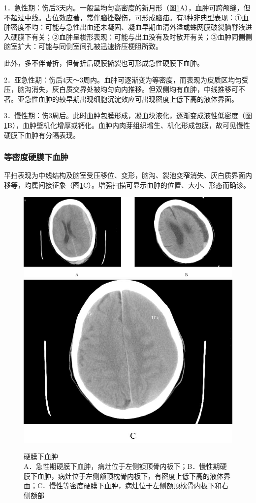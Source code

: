 1．急性期：伤后3天内。一般呈均匀高密度的新月形（图\ref{fig2-31}A），血肿可跨颅缝，但不超过中线。占位效应著，常伴脑挫裂伤，可形成脑疝。有3种非典型表现：①血肿密度不均：可能与急性出血还未凝固、凝血早期血清外溢或蛛网膜破裂脑脊液进入硬膜下有关；②血肿呈梭形表现：可能与出血没有及时散开有关；③血肿同侧侧脑室扩大：可能与同侧室间孔被迅速挤压梗阻所致。

此外，多不伴骨折，但骨折后硬膜撕裂也可形成急性硬膜下血肿。

2．亚急性期：伤后4天～3周内。血肿可逐渐变为等密度，而表现为皮质区均匀受压，脑沟消失，灰白质交界处被均匀向内推移。但双侧均有血肿，中线推移可不著。亚急性血肿的较早期出现细胞沉淀效应可出现密度上低下高的液体界面。

3．慢性期：伤3周后。此时血肿包膜形成，凝血块液化，逐渐变成液性低密度（图\ref{fig2-31}B），血肿壁机化增厚或钙化。血肿内肉芽组织增生、机化形成包膜，故可见慢性硬膜下血肿有分隔表现。

\subsubsection{等密度硬膜下血肿}

平扫表现为中线结构及脑室受压移位、变形，脑沟、裂池变窄消失、灰白质界面内移等，均属间接征象（图\ref{fig2-31}C）。增强扫描可显示血肿的位置、大小、形态而确诊。



\begin{figure}[!htbp]
 \centering
 \includegraphics[width=.7\textwidth,height=\textheight,keepaspectratio]{./images/Image00050.jpg}
 \includegraphics[width=.7\textwidth,height=\textheight,keepaspectratio]{./images/Image00051.jpg}
 \captionsetup{justification=centering}
 \caption{硬膜下血肿\\{\small A．急性期硬膜下血肿，病灶位于左侧额顶骨内板下；B．慢性期硬膜下血肿，病灶位于左侧额顶枕骨内板下，有密度上低下高的液体界面；C．慢性等密度硬膜下血肿，病灶位于左侧额顶枕骨内板下和右侧额部}}
 \label{fig2-31}
  \end{figure} 

